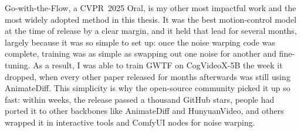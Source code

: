 Go-with-the-Flow, a CVPR~2025 Oral, is my other most impactful work and the most widely adopted method in this thesis. It was the best motion-control model at the time of release by a clear margin, and it held that lead for several months, largely because it was so simple to set up: once the noise warping code was complete, training was as simple as swapping out one noise for another and fine-tuning. As a result, I was able to train GWTF on CogVideoX-5B the week it dropped, when every other paper released for months afterwards was still using AnimateDiff. This simplicity is why the open-source community picked it up so fast: within weeks, the release passed a thousand GitHub stars, people had ported it to other backbones like AnimateDiff and HunyuanVideo, and others wrapped it in interactive tools and ComfyUI nodes for noise warping. 


